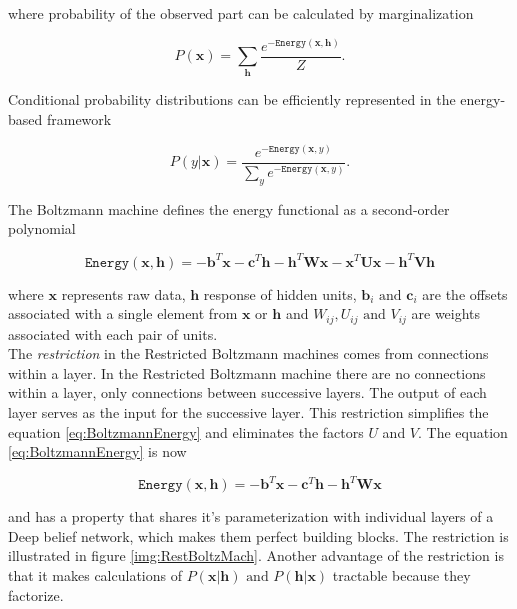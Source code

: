  where probability of the observed part can be calculated by marginalization
 
 \begin{equation}
	P(\mathbf{x}) = \sum_{\mathbf{h}}\frac{e^{-\mathtt{Energy}(\mathbf{x}, \mathbf{h})}}{Z}.
\end{equation}

Conditional probability distributions can be efficiently represented in the energy-based framework

\begin{equation}
	P(y| \mathbf{x}) = \frac{e^{-\mathtt{Energy}(\mathbf{x},y)}}{\sum_y e^{-\mathtt{Energy}(\mathbf{x},y)}}.
\end{equation}

The Boltzmann machine defines the energy functional as a second-order polynomial

\begin{equation}
	\mathtt{Energy}(\mathbf{x}, \mathbf{h}) = -\mathbf{b}^T\mathbf{x} - \mathbf{c}^T\mathbf{h} - \mathbf{h}^T\mathbf{W}\mathbf{x} - \mathbf{x}^T\mathbf{U}\mathbf{x} - \mathbf{h}^T\mathbf{V}\mathbf{h}
	\label{eq:BoltzmannEnergy}
\end{equation}

where $\mathbf{x}$ represents raw data, $\mathbf{h}$ response of hidden units, $\mathbf{b}_i \text{ and } \mathbf{c}_i$ are the offsets associated with a single element from $\mathbf{x}$ or $\mathbf{h}$ and $W_{ij}, U_{ij} \text{ and } V_{ij}$ are weights associated with each pair of units. \\

The \textit{restriction} in the Restricted Boltzmann machines comes from connections within a layer. In the Restricted Boltzmann machine there are no connections within a layer, only connections between successive layers. The output of each layer serves as the input for the successive layer.  This restriction simplifies the equation \ref{eq:BoltzmannEnergy} and eliminates the factors $U$ and $V$. The equation \ref{eq:BoltzmannEnergy} is now

\begin{equation}
	\mathtt{Energy}(\mathbf{x}, \mathbf{h}) = -\mathbf{b}^T\mathbf{x} - \mathbf{c}^T\mathbf{h} - \mathbf{h}^T\mathbf{W}\mathbf{x} 
	\label{eq:RestBoltzmannEnergy}
\end{equation}

and has a property that shares it's parameterization with individual layers of a Deep belief network, which makes them perfect building blocks. The restriction is illustrated in figure \ref{img:RestBoltzMach}. Another advantage of the restriction is that it makes calculations of $P(\mathbf{x} | \mathbf{h}) \text{ and } P(\mathbf{h} | \mathbf{x})$ tractable because they factorize.

